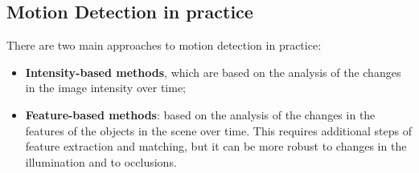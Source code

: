 \subsection{Motion Detection in practice}
There are two main approaches to motion detection in practice:
\begin{itemize}
    \item \textbf{Intensity-based methods}, which are based on the analysis of the changes in the image intensity over time;
    \item \textbf{Feature-based methods}: based on the analysis of the changes in the features of the objects in the scene over time.
    This requires additional steps of feature extraction and matching, but it can be more robust to changes in the illumination and to occlusions.
\end{itemize}

